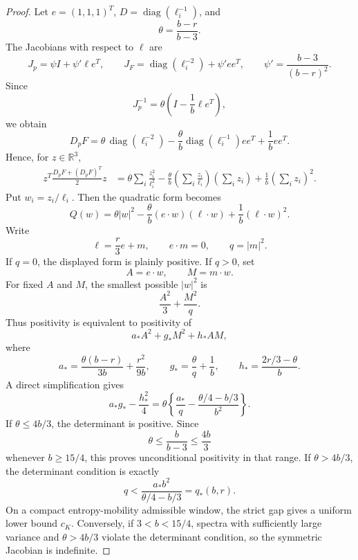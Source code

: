 \documentclass[11pt]{article}
\newcommand{\R}{\mathbb R}
\begin{document}
\begin{proof}
Let \(e=(1,1,1)^T\), \(D=\operatorname{diag}(\ell_i^{-1})\), and
\[
  \theta=\frac{b-r}{b-3}.
\]
The Jacobians with respect to \(\ell\) are
\[
  J_p=\psi I+\psi'\ell e^T,\qquad
  J_F=\operatorname{diag}(\ell_i^{-2})+\psi' ee^T,\qquad
  \psi'=\frac{b-3}{(b-r)^2}.
\]
Since
\[
  J_p^{-1}=\theta\left(I-\frac1b\ell e^T\right),
\]
we obtain
\[
  D_pF
  =\theta\,\operatorname{diag}(\ell_i^{-2})
   -\frac{\theta}{b}\operatorname{diag}(\ell_i^{-1})ee^T
   +\frac1b ee^T .
\]
Hence, for \(z\in\R^3\),
\[
\begin{aligned}
  z^T\frac{D_pF+(D_pF)^T}{2}z
  &=\theta\sum_i\frac{z_i^2}{\ell_i^2}
    -\frac{\theta}{b}\left(\sum_i\frac{z_i}{\ell_i}\right)
      \left(\sum_i z_i\right)
    +\frac1b\left(\sum_i z_i\right)^2 .
\end{aligned}
\]
Put \(w_i=z_i/\ell_i\).  Then the quadratic form becomes
\[
  Q(w)=\theta |w|^2-\frac{\theta}{b}(e\cdot w)(\ell\cdot w)
       +\frac1b(\ell\cdot w)^2 .
\]
Write
\[
  \ell=\frac r3 e+m,\qquad e\cdot m=0,\qquad q=|m|^2 .
\]
If \(q=0\), the displayed form is plainly positive.  If \(q>0\), set
\[
  A=e\cdot w,\qquad M=m\cdot w.
\]
For fixed \(A\) and \(M\), the smallest possible \(|w|^2\) is
\[
  \frac{A^2}{3}+\frac{M^2}{q}.
\]
Thus positivity is equivalent to positivity of
\[
  a_*A^2+g_*M^2+h_*AM,
\]
where
\[
  a_*=\frac{\theta(b-r)}{3b}+\frac{r^2}{9b},\qquad
  g_*=\frac{\theta}{q}+\frac1b,\qquad
  h_*=\frac{2r/3-\theta}{b}.
\]
A direct simplification gives
\[
  a_*g_*-\frac{h_*^2}{4}
  =\theta\left\{\frac{a_*}{q}
       -\frac{\theta/4-b/3}{b^2}\right\}.
\]
If \(\theta\le4b/3\), the determinant is positive.  Since
\[
  \theta\le \frac{b}{b-3}\le\frac{4b}{3}
\]
whenever \(b\ge15/4\), this proves unconditional positivity in that range.  If
\(\theta>4b/3\), the determinant condition is exactly
\[
  q<\frac{a_*b^2}{\theta/4-b/3}=q_*(b,r).
\]
On a compact entropy-mobility admissible window, the strict gap gives a uniform
lower bound \(c_K\).  Conversely, if \(3<b<15/4\), spectra with sufficiently large
variance and \(\theta>4b/3\) violate the determinant condition, so the symmetric
Jacobian is indefinite.
\end{proof}
\end{document}
